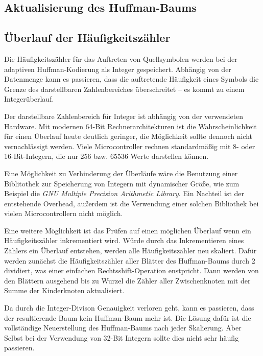 \documentclass[twoside,11pt,a4paper]{article}
\theoremstyle{break}
\begin{document}
\subsection{Aktualisierung des Huffman-Baums}


\subsection{Überlauf der Häufigkeitszähler}

Die Häufigkeitszähler für das Auftreten von Quellsymbolen werden bei der
adaptiven Huffman-Kodierung als Integer gespeichert. Abhängig von der Datenmenge
kann es passieren, dass die auftretende Häufigkeit eines Symbols die Grenze des
darstellbaren Zahlenbereiches überschreitet -- es kommt zu einem
Integerüberlauf.

Der darstellbare Zahlenbereich für Integer ist abhängig von der verwendeten
Hardware. Mit modernen 64-Bit Rechnerarchitekturen ist die Wahrscheinlichkeit
für einen Überlauf heute deutlich geringer, die Möglichkeit sollte dennoch nicht
vernachlässigt werden. Viele Microcontroller rechnen standardmäßig mit 8- oder
16-Bit-Integern, die nur 256 bzw. 65536 Werte darstellen können.

Eine Möglichkeit zu Verhinderung der Überläufe wäre die Benutzung einer
Biblitothek zur Speicherung von Integern mit dynamischer Größe, wie zum Beispiel
die \emph{GNU Multiple Precision Arithmetic Library}\cite{GMP}. Ein Nachteil ist
der entstehende Overhead, außerdem ist die Verwendung einer solchen Bibliothek
bei vielen Microcontrollern nicht möglich.

Eine weitere Möglichkeit ist das Prüfen auf einen möglichen Überlauf
wenn ein Häufigkeitszähler inkrementiert wird. Würde durch das
Inkrementieren eines Zählers ein Überlauf entstehen, werden alle
Häufigkeitszähler neu skaliert. Dafür werden zunächst die
Häufigkeitszähler aller Blätter des Huffman-Baums durch 2 dividiert,
was einer einfachen Rechtsshift-Operation enstpricht. Dann werden von
den Blättern ausgehend bis zu Wurzel die Zähler aller Zwischenknoten
mit der Summe der Kinderknoten aktualisiert.

Da durch die Integer-Divison Genauigkeit verloren geht, kann es passieren, dass
der resultierende Baum kein Huffman-Baum mehr ist. Die Lösung dafür ist die
vollständige Neuerstellung des Huffman-Baums nach jeder Skalierung. Aber Selbst
bei der Verwendung von 32-Bit Integern sollte dies nicht sehr häufig passieren.
\end{document}
